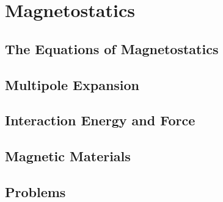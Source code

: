 \setcounter{chapter}{0}
\renewcommand{\thechapter}{4}
\chapter{Magnetostatics}
\setcounter{equation}{0}	        %

\section{The Equations of Magnetostatics}

\section{Multipole Expansion}

\section{Interaction Energy and Force}

\section{Magnetic Materials}


\section*{Problems}


